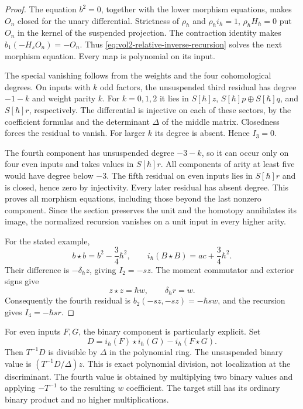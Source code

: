 \begin{proof}
The equation $b^2=0$, together with the lower morphism equations,
makes $O_n$ closed for the unary differential.
Strictness of $\rho_\hbar$ and
$\rho_\hbar i_\hbar=1$, $\rho_\hbar H_\hbar=0$
put $O_n$ in the kernel of the suspended projection.
The contraction identity makes $b_1(-H_sO_n)=-O_n$.
Thus \eqref{eq:vol2-relative-inverse-recursion} solves the next
morphism equation. Every map is polynomial on its input.

The special vanishing follows from the weights and the four
cohomological degrees. On inputs with $k$ odd factors, the
unsuspended third residual has degree $-1-k$ and weight parity
$k$. For $k=0,1,2$ it lies in $S[\hbar]z$,
$S[\hbar]p\oplus S[\hbar]q$, and $S[\hbar]r$,
respectively. The differential is injective on each of these
sectors, by the coefficient formulas and the determinant
$\Delta$ of the middle matrix. Closedness forces the residual
to vanish. For larger $k$ its degree is absent. Hence $I_3=0$.

The fourth component has unsuspended degree $-3-k$, so it
can occur only on four even inputs and takes values in
$S[\hbar]r$. All components of arity at least five would
have degree below $-3$. The fifth residual on even inputs
lies in $S[\hbar]r$ and is closed, hence zero by injectivity.
Every later residual has absent degree. This proves all
morphism equations, including those beyond the last nonzero
component. Since the section preserves the unit and the
homotopy annihilates its image, the normalized recursion
vanishes on a unit input in every higher arity.

For the stated example,
\[
 b\star b=b^2-\frac34\hbar^2,\qquad
 i_\hbar(B\star B)=ac+\frac34\hbar^2.
\]
Their difference is $-\delta_\hbar z$, giving $I_2=-sz$.
The moment commutator and exterior signs give
\[
 z\star z=\hbar w,\qquad \delta_\hbar r=w.
\]
Consequently the fourth residual is
$b_2(-sz,-sz)=-\hbar sw$, and the recursion gives
$I_4=-\hbar sr$.
\end{proof}

For even inputs $F,G$, the binary component is particularly
explicit. Set
\[
 D=i_\hbar(F)\star i_\hbar(G)-i_\hbar(F\star G).
\]
Then $T^{-1}D$ is divisible by $\Delta$ in the polynomial
ring. The unsuspended binary value is
$(T^{-1}D/\Delta)z$. This is exact polynomial division,
not localization at the discriminant.
The fourth value is obtained by multiplying two binary
values and applying $-T^{-1}$ to the resulting $w$ coefficient.
The target still has its ordinary binary product and no
higher multiplications.


